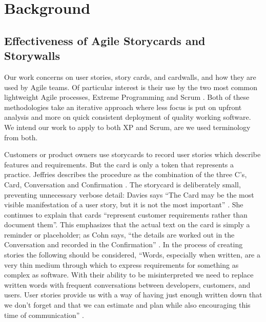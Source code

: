 \documentclass[lnbip,sechang,a4paper]{svmultln}
\begin{document}
\section{Background}

\subsection{Effectiveness of Agile Storycards and Storywalls}

Our work concerns on user stories, story cards, and cardwalls, and how
they are used by Agile teams. Of particular interest is their use by
the two most common lightweight Agile processes, Extreme Programming
\cite{XPvol} and Scrum \cite{Scrum}. Both of these methodologies take
an iterative approach where less focus is put on upfront analysis and
more on quick consistent deployment of quality working software.  We
intend our work to apply to both XP and Scrum, are we used terminology
from both.

Customers or product owners use storycards to record user stories
which describe features and requirements.  But the card is only a
token that represents a practice.  Jeffries describes the procedure as
the combination of the three C's, Card, Conversation and Confirmation
\cite{Jeffries}. The storycard is deliberately small, preventing
unnecessary verbose detail: Davies says ``The Card may be the most
visible manifestation of a user story, but it is not the most
important'' \cite{PowerStories}.  She continues to explain that cards
``represent customer requirements rather than document them''. This
emphasizes that the actual text on the card is simply a reminder or
placeholder; as Cohn says, ``the details are worked out in the
Conversation and recorded in the Confirmation''
\cite{UserStoriesApplied}. In the process of creating stories the
following should be considered, ``Words, especially when written, are
a very thin medium through which to express requirements for something
as complex as software. With their ability to be misinterpreted we
need to replace written words with frequent conversations between
developers, customers, and users. User stories provide us with a way
of having just enough written down that we don't forget and that we
can estimate and plan while also encouraging this time of
communication'' \cite{UserStoriesApplied}.
\end{document}
